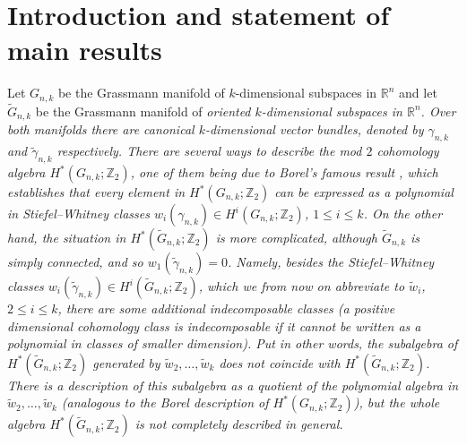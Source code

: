 \documentclass{amsart}
\theoremstyle{definition}
\theoremstyle{remark}
\numberwithin{equation}{section}
\begin{document}

\section{Introduction and statement of main results}
\label{intro}

Let $G_{n,k}$ be the Grassmann manifold of $k$-dimensional subspaces in $\mathbb R^n$ and let $\widetilde G_{n,k}$ be the Grassmann manifold of \em oriented \em $k$-dimensional subspaces in $\mathbb R^n$. Over both manifolds there are canonical $k$-dimensional vector bundles, denoted by $\gamma_{n,k}$ and $\widetilde\gamma_{n,k}$ respectively. There are several ways to describe the mod $2$ cohomology algebra $H^*(G_{n,k};\mathbb Z_2)$, one of them being due to Borel's famous result \cite{Borel}, which establishes that every element in $H^*(G_{n,k};\mathbb Z_2)$ can be expressed as a polynomial in Stiefel--Whitney classes $w_i(\gamma_{n,k})\in H^i(G_{n,k};\mathbb Z_2)$, $1\le i\le k$. On the other hand, the situation in $H^*(\widetilde G_{n,k};\mathbb Z_2)$ is more complicated, although $\widetilde G_{n,k}$ is simply connected, and so $w_1(\widetilde\gamma_{n,k})=0$. Namely, besides the Stiefel--Whitney classes $w_i(\widetilde\gamma_{n,k})\in H^i(\widetilde G_{n,k};\mathbb Z_2)$, which we from now on abbreviate to $\widetilde w_i$, $2\le i\le k$, there are some additional indecomposable classes (a positive dimensional cohomo\-logy class is \em indecomposable \em if it cannot be written as a polynomial in classes of smaller dimension). Put in other words, the subalgebra of $H^*(\widetilde G_{n,k};\mathbb Z_2)$ generated by $\widetilde w_2,\ldots,\widetilde w_k$ does not coincide with $H^*(\widetilde G_{n,k};\mathbb Z_2)$. There is a description of this subalgebra as a quotient of the polynomial algebra in $\widetilde w_2,\ldots,\widetilde w_k$ (analogous to the Borel description of $H^*(G_{n,k};\mathbb Z_2)$), but the whole algebra $H^*(\widetilde G_{n,k};\mathbb Z_2)$ is not completely described in general.
\end{document}
